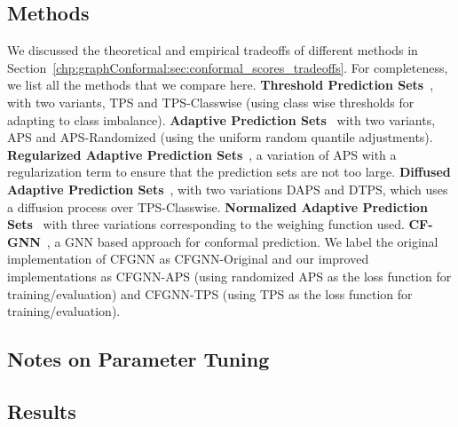 \subsection{Methods}
We discussed the theoretical and empirical tradeoffs of different methods in Section~\ref{chp:graphConformal:sec:conformal_scores_tradeoffs}.
For completeness, we list all the methods that we compare here.
\textbf{Threshold Prediction Sets}~\cite{sadinle2019least}, with two variants, TPS and TPS-Classwise (using class wise thresholds for adapting to class imbalance).
\textbf{Adaptive Prediction Sets}~\cite{romano2020classification} with two variants, APS and APS-Randomized (using the uniform random quantile adjustments).
\textbf{Regularized Adaptive Prediction Sets}~\cite{angelopoulos2021uncertainty}, a variation of APS with a regularization term to ensure that the prediction sets are not too large.
\textbf{Diffused Adaptive Prediction Sets}~\cite{zargarbashi23conformal}, with two variations DAPS and DTPS, which uses a diffusion process over TPS-Classwise.
\textbf{Normalized Adaptive Prediction Sets}~\cite{clarkson2023distribution} with three variations corresponding to the weighing function used.
\textbf{CF-GNN}~\cite{huang2024uncertainty}, a GNN based approach for conformal prediction. We label the original implementation of CFGNN as CFGNN-Original and our improved implementations as CFGNN-APS (using randomized APS as the loss function for training/evaluation) and CFGNN-TPS (using TPS as the loss function for training/evaluation).

\subsection{Notes on Parameter Tuning}

\subsection{Results}